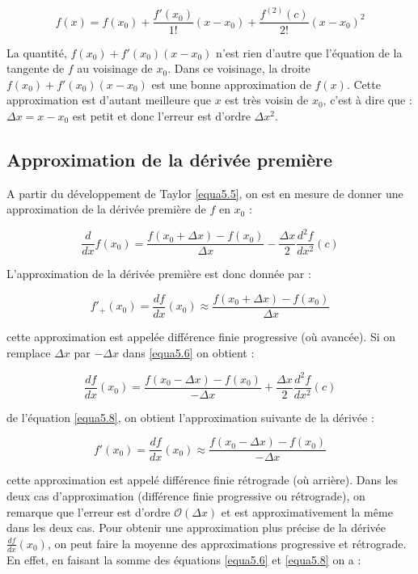 \begin{equation}\label{equa5.5}
f(x) = f(x_0) + \frac{f'(x_0)}{1!}(x - x_0) + \frac{f^{(2)}(c)}{2!}(x - x_0)^2
\end{equation}

La quantité, \( f(x_0) + f'(x_0)(x - x_0) \) n'est rien d'autre que l'équation de la tangente de \( f \) au voisinage de \( x_0 \). Dans ce voisinage, la droite \( f(x_0) + f'(x_0)(x - x_0) \) est une bonne approximation de \( f(x) \). Cette approximation est d'autant meilleure que \( x \) est très voisin de \( x_0 \), c'est à dire que : \( \Delta x = x - x_0 \) est petit et donc l'erreur est d'ordre \( \Delta x^2 \).

\subsection{Approximation de la dérivée première}
A partir du développement de Taylor \eqref{equa5.5}, on est en mesure de donner une approximation de la dérivée première de \( f \) en \( x_0 \) :

\begin{equation}\label{equa5.6}
\frac{d}{dx} f(x_0) = \frac{f(x_0 + \Delta x) - f(x_0)}{\Delta x} - \frac{\Delta x}{2} \frac{d^2 f}{dx^2}(c)
\end{equation}

L'approximation de la dérivée première est donc donnée par :

\begin{equation}\label{equ5.7}
f'_+(x_0) = \frac{d f}{dx}(x_0) \approx \frac{f(x_0 + \Delta x) - f(x_0)}{\Delta x}
\end{equation}

cette approximation est appelée différence finie progressive (où avancée). Si on remplace \( \Delta x \) par \( -\Delta x \) dans \eqref{equa5.6} on obtient :

\begin{equation}\label{equa5.8}
\frac{d f}{dx}(x_0) = \frac{f(x_0 - \Delta x) - f(x_0)}{-\Delta x} + \frac{\Delta x}{2} \frac{d^2 f}{dx^2}(c)
\end{equation}

de l'équation \eqref{equa5.8}, on obtient l'approximation suivante de la dérivée :

\begin{equation}\label{equa5.9}
f'(x_0) = \frac{df}{dx}(x_0) \approx \frac{f(x_0 - \Delta x) - f(x_0)}{-\Delta x}
\end{equation}

cette approximation est appelé différence finie rétrograde (où arrière). Dans les deux cas d'approximation (différence finie progressive ou rétrograde), on remarque que l'erreur est d'ordre \( \mathcal{O}(\Delta x) \) et est approximativement la même dans les deux cas. Pour obtenir une approximation plus précise de la dérivée \( \frac{df}{dx}(x_0) \), on peut faire la moyenne des approximations progressive et rétrograde. En effet, en faisant la somme des équations \eqref{equa5.6} et \eqref{equa5.8} on a :

